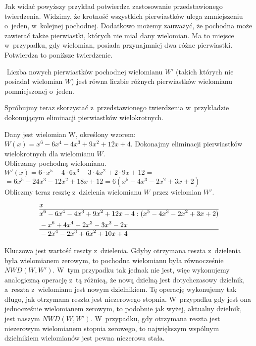 Jak widać powyższy przykład potwierdza zastosowanie przedstawionego twierdzenia. Widzimy, że krotność wszystkich pierwiastków ulega zmniejszeniu o~jeden, w~kolejnej pochodnej. Dodatkowo możemy zauważyć, że pochodna może zawierać także pierwiastki, których nie miał dany wielomian. Ma to miejsce w~przypadku, gdy wielomian, posiada przynajmniej dwa różne pierwiastki. Potwierdza to poniższe twierdzenie.

\begin{theorem}
	$ $
	Liczba nowych pierwiastków pochodnej wielomianu $W'$ (takich których nie posiadał wielomian $W$) jest równa liczbie różnych pierwiastków wielomianu pomniejszonej o~jeden.
\end{theorem}

Spróbujmy teraz skorzystać z~przedstawionego twierdzenia w~przykładzie dokonującym eliminacji pierwiastków wielokrotnych.

\begin{example}
	$ $ \\
	Dany jest wielomian W, określony wzorem: $W(x)=x^6-6x^4-4x^3+9x^2+12x+4$. Dokonajmy eliminacji pierwiastków wielokrotnych dla wielomianu $W$. \\
	Obliczamy pochodną wielomianu. \\
	$W'(x)=6 \cdot x^5-4 \cdot 6x^3-3 \cdot 4x^2+2 \cdot 9x+12=$ \\
	$=6x^5-24x^3-12x^2+18x+12=6(x^5-4x^3-2x^2+3x+2)$ \\
	Obliczmy teraz resztę z~dzielenia wielomianu $W$ przez wielomian $W'$.
	\begin{equation*}
	\begin{split}
		&x\\\hline
		&x^6-6x^4-4x^3+9x^2+12x+4 : (x^5-4x^3-2x^2+3x+2) \\
		&-x^6+4x^4+2x^3-3x^2-2x \\\hline
		&-2x^4-2x^3+6x^2+10x+4
	\end{split}
	\end{equation*}
	
	Kluczowa jest wartość reszty z~dzielenia. Gdyby otrzymana reszta z~dzielenia była wielomianem zerowym, to pochodna wielomianu była równocześnie $NWD(W, W')$. W~tym przypadku tak jednak nie jest, więc wykonujemy analogiczną operację z~tą różnicą, że nową dzielną jest dotychczasowy dzielnik, a~reszta z~wielomianu jest nowym dzielnikiem. Tę operację wykonujemy tak długo, jak otrzymana reszta jest niezerowego stopnia. W~przypadku gdy jest ona jednocześnie wielomianem zerowym, to podobnie jak wyżej, aktualny dzielnik, jest naszym $NWD(W, W')$. W~przypadku, gdy otrzymana reszta jest niezerowym wielomianem stopnia zerowego, to największym wspólnym dzielnikiem wielomianów jest pewna niezerowa stała.
\end{example}


